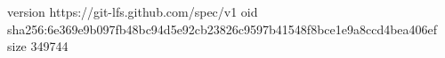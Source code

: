 version https://git-lfs.github.com/spec/v1
oid sha256:6e369e9b097fb48bc94d5e92cb23826c9597b41548f8bce1e9a8ccd4bea406ef
size 349744
